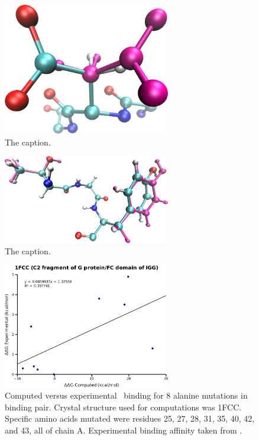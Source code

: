\begin{figure}[h]
  \centering
  \includegraphics[width=0.65\textwidth,height=0.3\textheight,keepaspectratio]{figures/mutation_side_chain_images/1dvf_chain_b_100.png}
  \caption{The caption.}
  \label{figure:computational_mutation_scanning/figname}
\end{figure}

\begin{figure}[h]
  \centering
  \includegraphics[width=0.65\textwidth,height=0.3\textheight,keepaspectratio]{figures/mutation_side_chain_images/1dvf_chain_b_30_and_32.png}
  \caption{The caption.}
  \label{figure:computational_mutation_scanning/figname}
\end{figure}
\clearpage

\begin{figure}[h]
    \centering
  \includegraphics[width=0.65\textwidth]{figures/1fcc.png}
  \caption{
Computed versus experimental \ddg\ binding for 8 alanine mutations in  binding pair.
Crystal structure used for computations was 1FCC.
Specific amino acids mutated were residues 25, 27, 28, 31, 35, 40, 42, and 43, all of chain A.
Experimental binding affinity taken from \protect\cite{thorn2001asedb}.
          }
\end{figure}

